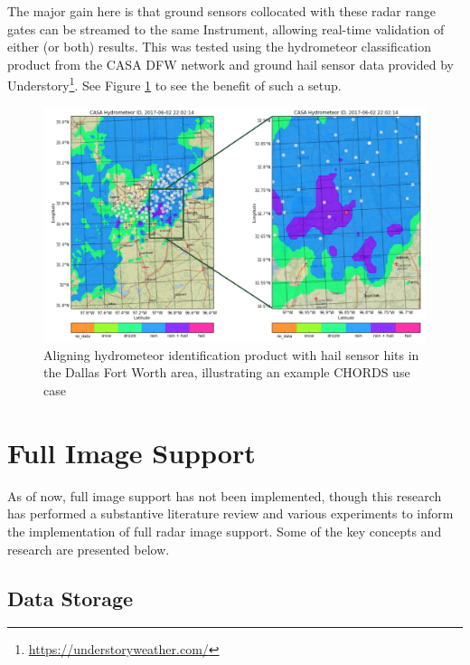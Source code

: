The major gain here is that ground sensors collocated with these radar range gates can be streamed to the same Instrument, allowing real-time validation of either (or both) results.
This was tested using the hydrometeor classification product from the CASA DFW network and ground hail sensor data provided by Understory\footnote{\url{https://understoryweather.com/}}.
See Figure \ref{fig:realtime_chordsportal_hail} to see the benefit of such a setup.

\begin{figure}
	\centering
	\includegraphics[width=\textwidth]{./thesis_code/plots/hail_radar_hid.png}
	\caption{Aligning hydrometeor identification product with hail sensor hits in the Dallas Fort Worth area, illustrating an example CHORDS use case}
	\label{fig:realtime_chordsportal_hail}
\end{figure}

\section{Full Image Support}
\label{sec:realtime_fullimage}

As of now, full image support has not been implemented, though this research has performed a substantive literature review and various experiments to inform the implementation of full radar image support.
Some of the key concepts and research are presented below.

\subsection{Data Storage}
\label{ssec:realtime_storage}

